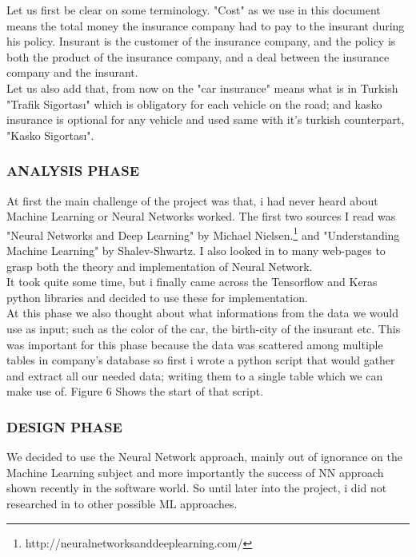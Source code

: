 \documentclass[titlepage, a4paper, 14pt]{extarticle} %
\begin{document}
Let us first be clear on some terminology. "Cost" as we use in this document means the total money the insurance company had to pay to the insurant during his policy. Insurant is the customer of the insurance company, and the policy is both the product of the insurance company, and a deal between the insurance company and the insurant.\\

Let us also add that, from now on the "car insurance" means what is in Turkish "Trafik Sigortası" which is obligatory for each vehicle on the road; and kasko insurance is optional for any vehicle and used same with it's turkish counterpart, "Kasko Sigortası".

\subsubsection{ANALYSIS PHASE} \label{analysis}
At first the main challenge of the project was that, i had never heard about Machine Learning or Neural Networks worked. The first two sources I read was "Neural Networks and Deep Learning" by Michael Nielsen.\footnote{http://neuralnetworksanddeeplearning.com/} and "Understanding Machine Learning" by Shalev-Shwartz. I also looked in to many web-pages to grasp both the theory and implementation of Neural Network. \\ 

It took quite some time, but i finally came across the Tensorflow and Keras python libraries and decided to use these for implementation. \\ At this phase we also thought about what informations from the data we would use as input; such as the color of the car, the birth-city of the insurant etc. This was important for this phase because the data was scattered among multiple tables in company's database so first i wrote a python script that would gather and extract all our needed data; writing them to a single table which we can make use of. Figure 6 Shows the start of that script.

\subsubsection{DESIGN PHASE} \label{design}

We decided to use the Neural Network approach, mainly out of ignorance on the Machine Learning subject and more importantly the success of NN approach shown recently in the software world. So until later into the project, i did not researched in to other possible ML approaches. \\
\end{document}
